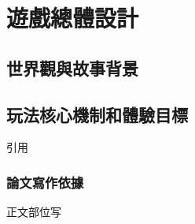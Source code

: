 \chapter{遊戲總體設計}
\section{世界觀與故事背景}
\section{玩法核心機制和體驗目標}
\citep{abdoh2019} 引用
\subsection{論文寫作依據}
正文部位写